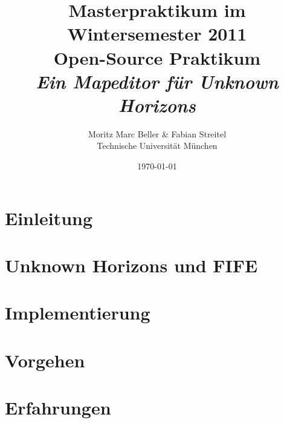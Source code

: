 \documentclass[german]{scrartcl}
\author{Moritz Marc Beller \& Fabian Streitel \\ Technische Universität München}
\title{Masterpraktikum im Wintersemester 2011 \\
Open-Source Praktikum \\
\textit{Ein Mapeditor für Unknown Horizons}}
\date{\today} %
\begin{document}
\maketitle{}

\section{Einleitung}


\section{Unknown Horizons und FIFE}


\section{Implementierung}


\section{Vorgehen}


\section{Erfahrungen}


{}
\end{document}
